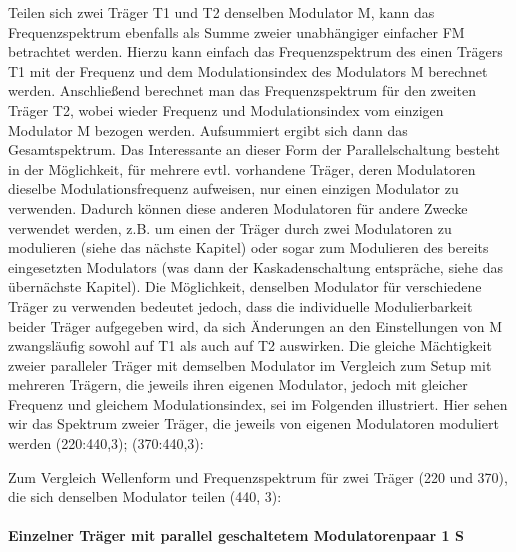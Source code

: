 Teilen sich zwei Träger T1 und T2 denselben Modulator M, kann das Frequenzspektrum ebenfalls als Summe zweier unabhängiger einfacher FM betrachtet werden. Hierzu kann einfach das Frequenzspektrum des einen Trägers T1 mit der Frequenz und dem Modulationsindex des Modulators M berechnet werden. Anschließend berechnet man das Frequenzspektrum für den zweiten Träger T2, wobei wieder Frequenz und Modulationsindex vom einzigen Modulator M bezogen werden. Aufsummiert ergibt sich dann das Gesamtspektrum. Das Interessante an dieser Form der Parallelschaltung  besteht in der Möglichkeit, für mehrere evtl. vorhandene Träger, deren Modulatoren dieselbe Modulationsfrequenz aufweisen, nur einen einzigen Modulator zu verwenden. Dadurch können diese anderen Modulatoren für andere Zwecke verwendet werden, z.B. um einen der Träger durch zwei Modulatoren zu modulieren (siehe das nächste Kapitel) oder sogar zum Modulieren des bereits eingesetzten Modulators (was dann der Kaskadenschaltung entspräche, siehe das übernächste Kapitel). Die Möglichkeit, denselben Modulator für verschiedene Träger zu verwenden bedeutet jedoch, dass die individuelle Modulierbarkeit beider Träger aufgegeben wird, da sich Änderungen an den Einstellungen von M zwangsläufig sowohl auf T1 als auch auf T2 auswirken. Die gleiche Mächtigkeit zweier paralleler Träger mit demselben Modulator im Vergleich zum Setup mit mehreren Trägern, die jeweils ihren eigenen Modulator, jedoch mit gleicher Frequenz und gleichem Modulationsindex, sei im Folgenden illustriert. Hier sehen wir das Spektrum zweier Träger, die jeweils von eigenen Modulatoren moduliert werden (220:440,3); (370:440,3):

Zum Vergleich Wellenform und Frequenzspektrum für zwei Träger (220 und 370), die sich denselben Modulator teilen (440, 3):

\paragraph{Einzelner Träger mit parallel geschaltetem Modulatorenpaar 1 S}$\;$

